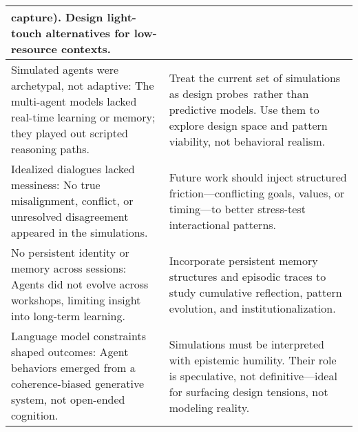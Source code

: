 \documentclass[acmlarge,timestamp]{acmart}
\begin{document}
{\begin{longtable}[]{@{}p{}p{}@{}}
{    capture). Design light-touch alternatives for low-resource
    contexts.} \\ \hline
{Simulated agents were archetypal, not adaptive}{: The multi-agent
  models lacked real-time learning or memory; they played out scripted
  reasoning paths.}
& {Treat the current set of simulations as }{design probes}{~rather
  than predictive models. Use them to explore design space and pattern
  viability, not behavioral realism.} \\ \hline
{Idealized dialogues lacked messiness}{: No true misalignment,
  conflict, or unresolved disagreement appeared in the simulations.}
& {Future work should inject structured friction---conflicting goals,
    values, or timing---to better stress-test interactional patterns.}
\\ \hline
{No persistent identity or memory across sessions}{: Agents did not
  evolve across workshops, limiting insight into long-term learning.}
& {Incorporate persistent memory structures and episodic traces to
    study cumulative reflection, pattern evolution, and
    institutionalization.} \\ \hline
 {Language model constraints
  shaped outcomes}{: Agent behaviors emerged from a coherence-biased
  generative system, not open-ended cognition.}
& {Simulations must be interpreted with epistemic humility. Their role
    is speculative, not definitive---ideal for surfacing design
    tensions, not modeling reality.} \\ \hline
\end{longtable}

}
\end{document}
